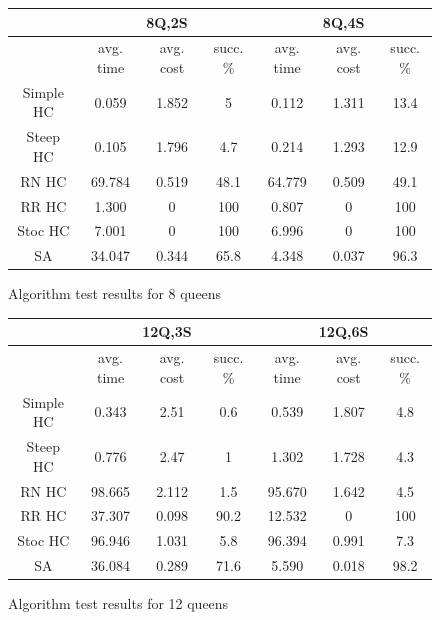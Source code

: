\documentclass[10pt,a4paper]{article}
\begin{document}
                \begin{figure}[h!]
                        \centering
                        \caption{Algorithm test results for 8 queens}
                        \begin{tabular}{|c|c|c|c|c|c|c|}
                                \hline \hline
                                & \multicolumn{3}{c|}{8Q,2S} & \multicolumn{3}{c|}{8Q,4S} \\
                                \hline
                                &avg. time&avg. cost&succ. \%&avg. time&avg. cost&succ. \% \\
                                \hline \hline
				Simple HC&0.059&1.852&5&0.112&1.311&13.4 \\
                                \hline
				Steep HC&0.105&1.796&4.7&0.214&1.293&12.9 \\
                                \hline
				RN HC&69.784&0.519&48.1&64.779&0.509&49.1 \\
                                \hline
				RR HC&1.300&0&100&0.807&0&100 \\
                                \hline
				Stoc HC&7.001&0&100&6.996&0&100 \\
                                \hline
				SA&34.047&0.344&65.8&4.348&0.037&96.3 \\
                                \hline
                        \end{tabular}
                \end{figure}
                \begin{figure}[h!]
                        \centering
                        \caption{Algorithm test results for 12 queens}
                        \begin{tabular}{|c|c|c|c|c|c|c|}
                                \hline \hline
                                & \multicolumn{3}{c|}{12Q,3S} & \multicolumn{3}{c|}{12Q,6S} \\
                                \hline
                                &avg. time&avg. cost&succ. \%&avg. time&avg. cost&succ. \% \\
                                \hline \hline
				Simple HC&0.343&2.51&0.6&0.539&1.807&4.8 \\
                                \hline
				Steep HC&0.776&2.47&1&1.302&1.728&4.3 \\
                                \hline
				RN HC&98.665&2.112&1.5&95.670&1.642&4.5 \\
                                \hline
				RR HC&37.307&0.098&90.2&12.532&0&100 \\
                                \hline
				Stoc HC&96.946&1.031&5.8&96.394&0.991&7.3 \\
                                \hline
				SA&36.084&0.289&71.6&5.590&0.018&98.2 \\
                                \hline
                        \end{tabular}
                \end{figure}
\end{document}
